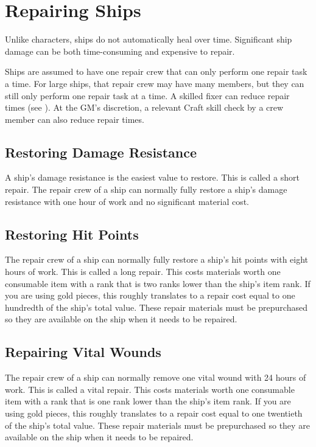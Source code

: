 \section{Repairing Ships}
    Unlike characters, ships do not automatically heal over time.
    Significant ship damage can be both time-consuming and expensive to repair.

    Ships are assumed to have one repair crew that can only perform one repair task a time.
    For large ships, that repair crew may have many members, but they can still only perform one repair task at a time.
    A skilled fixer can reduce repair times (see ).
    At the GM's discretion, a relevant Craft skill check by a crew member can also reduce repair times.

    \subsection{Restoring Damage Resistance}
        A ship's damage resistance is the easiest value to restore.
        This is called a short repair.
        The repair crew of a ship can normally fully restore a ship's damage resistance with one hour of work and no significant material cost.

    \subsection{Restoring Hit Points}
        The repair crew of a ship can normally fully restore a ship's hit points with eight hours of work.
        This is called a long repair.
        This costs materials worth one consumable item with a rank that is two ranks lower than the ship's item rank.
        If you are using gold pieces, this roughly translates to a repair cost equal to one hundredth of the ship's total value.
        These repair materials must be prepurchased so they are available on the ship when it needs to be repaired.

    \subsection{Repairing Vital Wounds}
        The repair crew of a ship can normally remove one vital wound with 24 hours of work.
        This is called a vital repair.
        This costs materials worth one consumable item with a rank that is one rank lower than the ship's item rank.
        If you are using gold pieces, this roughly translates to a repair cost equal to one twentieth of the ship's total value.
        These repair materials must be prepurchased so they are available on the ship when it needs to be repaired.

